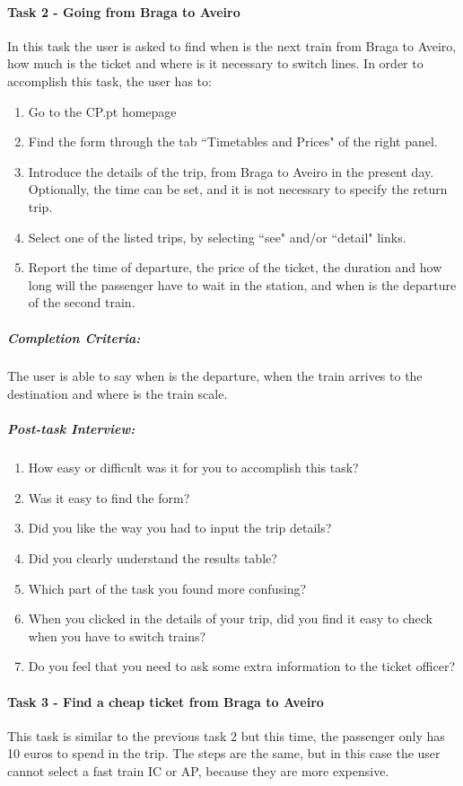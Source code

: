\documentclass[a4paper]{article}
\begin{document}
\paragraph{Task 2 - Going from Braga to Aveiro} In this task the user is asked to find when is the next train from Braga to Aveiro, how much is the ticket and where is it necessary to switch lines. In order to accomplish this task, the user has to:

\begin{enumerate}[label=\roman*.]
  \item Go to the CP.pt homepage
  \item Find the form through the tab ``Timetables and Prices" of the right panel.
  \item Introduce the details of the trip, from Braga to Aveiro in the present day. Optionally, the time can be set, and it is not necessary to specify the return trip.
  \item Select one of the listed trips, by selecting ``see" and/or ``detail" links. 
  \item Report the time of departure, the price of the ticket, the duration and how long will the passenger have to wait in the station, and when is the departure of the second train.
\end{enumerate}

\subparagraph{Completion Criteria:} The user is able to say when is the departure, when the train arrives to the destination and where is the train scale.

\subparagraph{Post-task Interview:}

\begin{enumerate}[label=2.\theenumi .]
  \item How easy or difficult was it for you to accomplish this task?
  \item Was it easy to find the form?
  \item Did you like the way you had to input the trip details?
  \item Did you clearly understand the results table?
  \item Which part of the task you found more confusing?
  \item When you clicked in the details of your trip, did you find it easy to check when you have to switch trains?
   \item Do you feel that you need to ask some extra information to the ticket officer?
\end{enumerate}


\paragraph{Task 3 - Find a cheap ticket from Braga to Aveiro}
This task is similar to the previous task 2 but this time, the passenger only has 10 euros to spend in the trip. The steps are the same, but in this case the user cannot select a fast train IC or AP, because they are more expensive.
\end{document}
